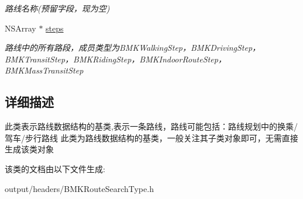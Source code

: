 \begin{DoxyCompactItemize}
\begin{DoxyCompactList}\small\item\em 路线名称(预留字段，现为空) \end{DoxyCompactList}\item 
\hypertarget{interface_b_m_k_route_line_a181c231815114b03dfc858ac26a0168a}{}N\+S\+Array $\ast$ \hyperlink{interface_b_m_k_route_line_a181c231815114b03dfc858ac26a0168a}{steps}\label{interface_b_m_k_route_line_a181c231815114b03dfc858ac26a0168a}

\begin{DoxyCompactList}\small\item\em 路线中的所有路段，成员类型为\+B\+M\+K\+Walking\+Step，\+B\+M\+K\+Driving\+Step，\+B\+M\+K\+Transit\+Step，\+B\+M\+K\+Riding\+Step，\+B\+M\+K\+Indoor\+Route\+Step，\+B\+M\+K\+Mass\+Transit\+Step \end{DoxyCompactList}\end{DoxyCompactItemize}


\subsection{详细描述}
此类表示路线数据结构的基类,表示一条路线，路线可能包括：路线规划中的换乘/驾车/步行路线 此类为路线数据结构的基类，一般关注其子类对象即可，无需直接生成该类对象 

该类的文档由以下文件生成\+:\begin{DoxyCompactItemize}
\item 
output/headers/B\+M\+K\+Route\+Search\+Type.\+h\end{DoxyCompactItemize}

